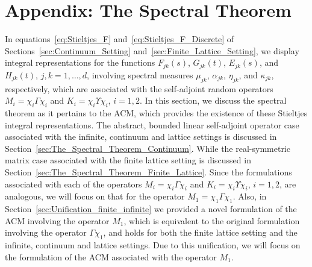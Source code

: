 \documentclass{cmslatex}
\renewcommand{\theequation}{\arabic{section}.\arabic{equation}}
\begin{document}
  \setcounter{equation}{1}  %
  \setcounter{section}{0}  %
  \renewcommand{\theequation}{A-\arabic{equation}} 
\renewcommand{\thesection}{A-\arabic{section}}
\section{Appendix: The Spectral Theorem} 
\label{sec:The_Spectral_Theorem}
%
In equations~\eqref{eq:Stieltjes_F}
and~\eqref{eq:Stieltjes_F_Discrete} of 
Sections~\ref{sec:Continuum_Setting}
and~\ref{sec:Finite_Lattice_Setting}, we display integral
representations for the functions $F_{jk}(s)$, $G_{jk}(t)$,
$E_{jk}(s)$, and $H_{jk}(t)$, $j,k=1,\ldots,d$, involving spectral measures
$\mu_{jk}$, $\alpha_{jk}$, $\eta_{jk}$, and $\kappa_{jk}$, respectively, which are
associated with the self-adjoint random operators $M_i=\chi_i\Gamma\chi_i$ and
$K_i=\chi_i\Upsilon\chi_i$, $i=1,2$. In this section, we discuss the spectral
theorem as it pertains to the ACM, which provides the existence of
these Stieltjes integral representations. The abstract, bounded linear
self-adjoint operator case~\cite{Reed-1980,Stone:64} associated with
the infinite, continuum and lattice settings is discussed in
Section~\ref{sec:The_Spectral_Theorem_Continuum}. While the
real-symmetric matrix case \cite{Halmos-1958,Stakgold:BVP:2000}
associated with the finite lattice setting is discussed in
Section~\ref{sec:The_Spectral_Theorem_Finite_Lattice}. Since the
formulations associated with each of the operators $M_i=\chi_i\Gamma\chi_i$ and
$K_i=\chi_i\Upsilon\chi_i$, $i=1,2$, are analogous, we will focus on that for the
operator $M_1=\chi_1\Gamma\chi_1$. Also, in
Section~\ref{sec:Unification_finite_infinite} we provided a novel
formulation of the ACM involving the operator $M_1$, which is
equivalent to the original formulation~\cite{Golden:CMP-473} involving
the operator $\Gamma\chi_1$, and holds for both the finite lattice setting and
the infinite, continuum and lattice settings. Due to this unification,
we will focus on the formulation of the ACM associated with the
operator $M_1$.   
%
\end{document}
